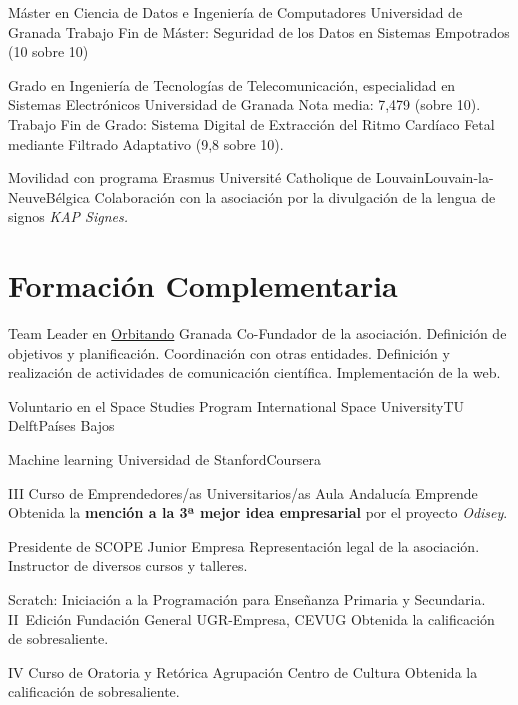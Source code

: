 \documentclass[11pt,a4paper,sans,spanish]{moderncv}
\begin{document}
{Máster en Ciencia de Datos e Ingeniería de Computadores}
{Universidad de Granada}{}{}
{Trabajo Fin de Máster:
Seguridad de los Datos en Sistemas Empotrados (10 sobre 10)}

{Grado en Ingeniería de Tecnologías de Telecomunicación, especialidad en Sistemas Electrónicos}
{Universidad de Granada}{}{}
{Nota media: 7,479 (sobre 10).
Trabajo Fin de Grado:
Sistema Digital de Extracción del Ritmo Cardíaco Fetal mediante Filtrado Adaptativo (9,8 sobre 10).}

{Movilidad con programa Erasmus}
{Université Catholique de Louvain}{Louvain-la-Neuve}{Bélgica}
{Colaboración con la asociación por la divulgación de la lengua de signos \emph{KAP Signes.}}


\section{Formación Complementaria}

{Team Leader en \href{https://orbitando.space}{Orbitando}}
{}{Granada}{}
{Co-Fundador de la asociación. Definición de objetivos y planificación. Coordinación con otras entidades. Definición y realización de actividades de comunicación científica. Implementación de la web.}

{Voluntario en el Space Studies Program}
{International Space University}{TU Delft}{Países Bajos}
{}

{Machine learning}
{Universidad de Stanford}{Coursera}{}
{}

{III Curso de Emprendedores/as Universitarios/as}
{Aula Andalucía Emprende}{}{}
{Obtenida la \textbf{mención a la 3ª mejor idea empresarial} por el proyecto \emph{Odisey}. }

{Presidente de SCOPE Junior Empresa}
{}{}{}
{Representación legal de la asociación. Instructor de diversos cursos y talleres.
}

{Scratch: Iniciación a la Programación para Enseñanza Primaria y Secundaria. II~Edición}
{Fundación General UGR-Empresa, CEVUG}{}{}
{Obtenida la calificación de sobresaliente.}

{IV Curso de Oratoria y Retórica}
{Agrupación Centro de Cultura}{}{}
{Obtenida la calificación de sobresaliente.}
\end{document}
